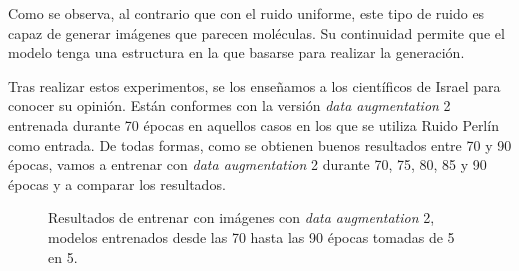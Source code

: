 Como se observa, al contrario que con el ruido uniforme, este tipo de ruido es capaz de generar imágenes que parecen moléculas. Su continuidad permite que el modelo tenga una estructura en la que basarse para realizar la generación. 

Tras realizar estos experimentos, se los enseñamos a los científicos de Israel para conocer su opinión. Están conformes con la versión \textit{data augmentation} 2 entrenada durante 70 épocas en aquellos casos en los que se utiliza Ruido Perlín como entrada. De todas formas, como se obtienen buenos resultados entre 70 y 90 épocas, vamos a entrenar con \textit{data augmentation} 2 durante 70, 75, 80, 85 y 90 épocas y a comparar los resultados.

\begin{figure}[H]
\centering
    \caption{Resultados de entrenar con imágenes con \textit{data augmentation} 2, modelos entrenados desde las 70 hasta las 90 épocas tomadas de 5 en 5.}
\end{figure}


